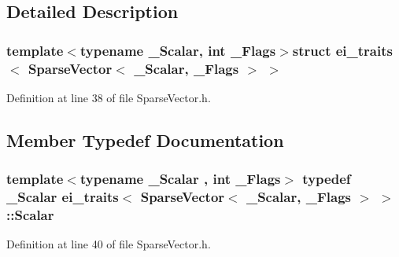 \subsection{Detailed Description}
\subsubsection*{template$<$typename \-\_\-\-Scalar, int \-\_\-\-Flags$>$struct ei\-\_\-traits$<$ Sparse\-Vector$<$ \-\_\-\-Scalar, \-\_\-\-Flags $>$ $>$}



Definition at line 38 of file Sparse\-Vector.\-h.



\subsection{Member Typedef Documentation}
\hypertarget{structei__traits_3_01_sparse_vector_3_01___scalar_00_01___flags_01_4_01_4_a7f6f54419189ca5c61043b90b2867067}{
\subsubsection[{Scalar}]{\setlength{\rightskip}{0pt plus 5cm}template$<$typename \-\_\-\-Scalar , int \-\_\-\-Flags$>$ typedef \-\_\-\-Scalar {\bf ei\-\_\-traits}$<$ {\bf Sparse\-Vector}$<$ \-\_\-\-Scalar, \-\_\-\-Flags $>$ $>$\-::{\bf Scalar}}}\label{structei__traits_3_01_sparse_vector_3_01___scalar_00_01___flags_01_4_01_4_a7f6f54419189ca5c61043b90b2867067}


Definition at line 40 of file Sparse\-Vector.\-h.



